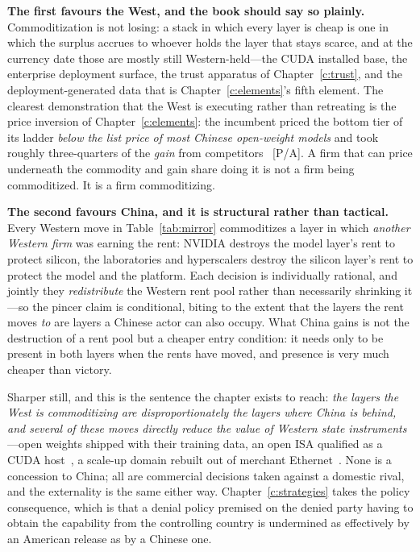 \textbf{The first favours the West, and the book should say so plainly.} Commoditization is not losing: a stack in which every layer is cheap is one in which the surplus accrues to whoever holds the layer that stays scarce, and at the currency date those are mostly still Western-held---the CUDA installed base, the enterprise deployment surface, the trust apparatus of Chapter~\ref{c:trust}, and the deployment-generated data that is Chapter~\ref{c:elements}'s fifth element. The clearest demonstration that the West is executing rather than retreating is the price inversion of Chapter~\ref{c:elements}: the incumbent priced the bottom tier of its ladder \emph{below the list price of most Chinese open-weight models} and took roughly three-quarters of the \emph{gain} from competitors~\cite{price-inversion} [P/A]. A firm that can price underneath the commodity and gain share doing it is not a firm being commoditized. It is a firm commoditizing.

\textbf{The second favours China, and it is structural rather than tactical.} Every Western move in Table~\ref{tab:mirror} commoditizes a layer in which \emph{another Western firm} was earning the rent: NVIDIA destroys the model layer's rent to protect silicon, the laboratories and hyperscalers destroy the silicon layer's rent to protect the model and the platform. Each decision is individually rational, and jointly they \emph{redistribute} the Western rent pool rather than necessarily shrinking it---so the pincer claim is conditional, biting to the extent that the layers the rent moves \emph{to} are layers a Chinese actor can also occupy. What China gains is not the destruction of a rent pool but a cheaper entry condition: it needs only to be present in both layers when the rents have moved, and presence is very much cheaper than victory.

Sharper still, and this is the sentence the chapter exists to reach: \emph{the layers the West is commoditizing are disproportionately the layers where China is behind, and several of these moves directly reduce the value of Western state instruments}---open weights shipped with their training data, an open ISA qualified as a CUDA host~\cite{hc2026-nv-riscv}, a scale-up domain rebuilt out of merchant Ethernet~\cite{hc2026-scaleup}. None is a concession to China; all are commercial decisions taken against a domestic rival, and the externality is the same either way. Chapter~\ref{c:strategies} takes the policy consequence, which is that a denial policy premised on the denied party having to obtain the capability from the controlling country is undermined as effectively by an American release as by a Chinese one.

